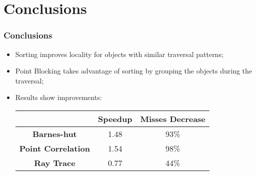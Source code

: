 \section{Conclusions}
\begin{frame}
	\frametitle{Conclusions}
	\begin{itemize}
		\item Sorting improves locality for objects with similar traversal patterns;

		\item Point Blocking takes advantage of sorting by grouping the objects during the traversal;

		\item Results show improvements:
		\begin{table}
			\begin{tabular}{|c|cc|}
				\hline
				& \textbf{Speedup} & \textbf{Misses Decrease}	\\
				\hline
				\textbf{Barnes-hut} &  1.48 & 93\%	\\
				\textbf{Point Correlation} & 1.54 & 98\%	\\
				\textbf{Ray Trace} & 0.77 & 44\%	\\
				\hline
			\end{tabular}
		\end{table}
	\end{itemize}
\end{frame}